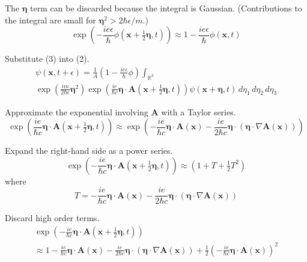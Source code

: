 \documentclass[12pt]{article}
\newcommand\INT{\int_{\mathbb R^3}}
\begin{document}
The $\boldsymbol\eta$ term can be discarded because the integral is Gaussian.
(Contributions to the integral are small for $\boldsymbol\eta^2>2\hbar\epsilon/m$.)
\begin{equation*}
\exp\left(-\frac{ie\epsilon}{\hbar}\phi\left(\mathbf x+\tfrac{1}{2}\boldsymbol\eta,t\right)\right)\approx
1-\frac{ie\epsilon}{\hbar}\phi(\mathbf x,t)
\tag{3}
\end{equation*}

Substitute (3) into (2).
\begin{multline*}
\psi(\mathbf x,t+\epsilon)=
\frac{1}{A}\left(1-\frac{ie\epsilon}{\hbar}\phi\right)\INT
\\
\exp\left(\frac{im}{2\hbar\epsilon}\boldsymbol\eta^2\right)
\exp\left(\frac{ie}{\hbar c}\boldsymbol\eta\cdot\mathbf A\left(\mathbf x+\tfrac{1}{2}\boldsymbol\eta,t\right)\right)
\psi(\mathbf x+\boldsymbol\eta,t)
\,d\eta_1\,d\eta_2\,d\eta_3
\end{multline*}

Approximate the exponential involving $\mathbf A$ with a Taylor series.
\begin{equation*}
\exp\left(\frac{ie}{\hbar c}\boldsymbol\eta\cdot\mathbf A\left(\mathbf x+\tfrac{1}{2}\boldsymbol\eta,t\right)\right)
\approx
\exp\left(
-\frac{ie}{\hbar c}\boldsymbol\eta\cdot\mathbf A(\mathbf x)
-\frac{ie}{2\hbar c}\boldsymbol\eta\cdot(\boldsymbol\eta\cdot\nabla\mathbf A(\mathbf x))
\right)
\end{equation*}

Expand the right-hand side as a power series.
\begin{equation*}
\exp\left(-\frac{ie}{\hbar c}\boldsymbol\eta\cdot\mathbf A\left(\mathbf x+\tfrac{1}{2}\boldsymbol\eta,t\right)\right)
\approx
\left(1+T+\tfrac{1}{2}T^2\right)
\end{equation*}
where
\begin{equation*}
T=-\frac{ie}{\hbar c}\boldsymbol\eta\cdot\mathbf A(\mathbf x)
-\frac{ie}{2\hbar c}\boldsymbol\eta\cdot(\boldsymbol\eta\cdot\nabla\mathbf A(\mathbf x))
\end{equation*}

Discard high order terms.
\begin{multline*}
\exp\left(-\frac{ie}{\hbar c}\boldsymbol\eta\cdot\mathbf A\left(\mathbf x+\tfrac{1}{2}\boldsymbol\eta,t\right)\right)
\\
\approx
1
-\frac{ie}{\hbar c}\boldsymbol\eta\cdot\mathbf A(\mathbf x)
-\frac{ie}{2\hbar c}\boldsymbol\eta\cdot(\boldsymbol\eta\cdot\nabla\mathbf A(\mathbf x))
+\frac{1}{2}\left(-\frac{ie}{\hbar c}\boldsymbol\eta\cdot\mathbf A(\mathbf x)\right)^2
\end{multline*}
\end{document}
